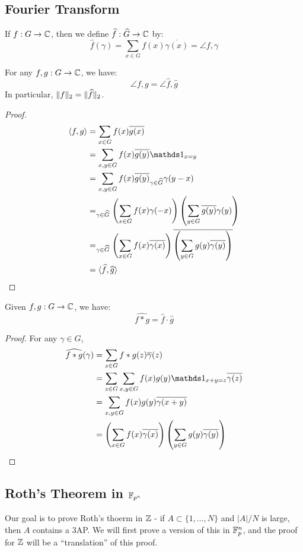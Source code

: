 \documentclass[10pt,a4paper]{article}
\let\E\relax
\DeclareMathOperator*{\E}{\raisebox{-0.45em}{\text{\huge $\mathds{E}$}}}
\begin{document}
\subsection{Fourier Transform}
If $f: G \to \mathbb{C}$, then we define $\widehat{f} : \widehat{G} \to \mathbb{C}$ by:
\[\hat{f}(\gamma) = \sum_{x\in G} f(x)\overline{\gamma(x)} = \angle{f, \gamma}\]
\begin{lemma}
  For any $f, g : G \to \mathbb{C}$, we have:
  \[\angle{f, g} = \angle{\hat{f}, \hat{g}}\]
  In particular, $\lVert f\rVert_2 = \lVert\widehat{f}\rVert_2$.
\end{lemma}
\begin{proof}
  \begin{align*}
    \angle{f,g} &= \sum_{x\in G} f(x) \overline{g(x)}\\
    &= \sum_{x,y \in G}f(x)\overline{g(y)}\one_{x=y}\\
    &= \sum_{x,y \in G}f(x)\overline{g(y)}\E_{\gamma \in \hat{G}}\gamma(y-x)\\
    &= \E_{\gamma \in \hat{G}}\left(\sum_{x\in G}f(x)\gamma(-x)\right)\left(\sum_{y\in G}\overline{g(y)}\gamma(y)\right)\\
    &= \E_{\gamma \in \hat{G}}\left(\sum_{x\in G} f(x)\overline{\gamma(x)}\right)\overline{\left(\sum_{y\in G} g(y)\overline{\gamma(y)}\right)}\\
    &= \angle{\hat{f}, \hat{g}}
  \end{align*}
\end{proof}
\begin{lemma}
  Given $f, g:G \to \mathbb{C}$, we have:
  \[\widehat{f\ast g} = \hat{f}\cdot \hat{g}\]
\end{lemma}
\begin{proof}
  For any $\gamma \in \hat{G}$,
  \begin{align*}
    \widehat{f\ast g}(\gamma) &= \sum_{z\in G} f\ast g(z) \overline{\gamma}(z)\\
    &= \sum_{z\in G}\sum_{x,y \in G} f(x) g(y) \one_{x+y=z}\overline{\gamma(z)}\\
    &= \sum_{x,y \in G} f(x)g(y)\overline{\gamma(x+y)}\\
    &= \left(\sum_{x\in G}f(x)\overline{\gamma(x)}\right)\left(\sum_{y \in G}g(y)\overline{\gamma(y)}\right)
  \end{align*}
\end{proof}
\subsection{Roth's Theorem in $\mathbb{F}_{p^n}$}
Our goal is to prove Roth's thoerm in $\mathbb{Z}$ - if $A \subset \{1, \ldots, N\}$ and $|A|/N$ is large, then $A$ contains a 3AP. We will first prove a version of this in $\mathbb{F}_p^n$, and the proof for $\mathbb{Z}$ will be a ``translation'' of this proof.
\end{document}
